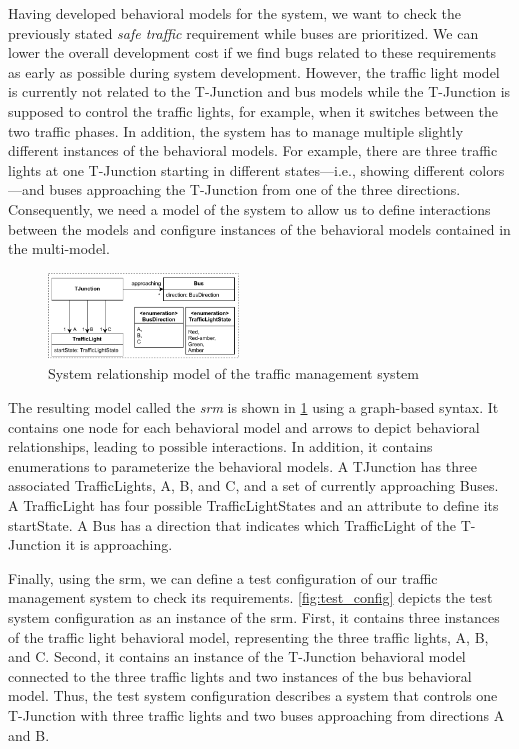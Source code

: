 \documentclass{jot}
\begin{document}
Having developed behavioral models for the system, we want to check the previously stated \textit{safe traffic} requirement while buses are prioritized.
We can lower the overall development cost if we find bugs related to these requirements as early as possible during system development.
However, the traffic light model is currently not related to the T-Junction and bus models while the T-Junction is supposed to control the traffic lights, for example, when it switches between the two traffic phases.
In addition, the system has to manage multiple slightly different instances of the behavioral models.
For example, there are three traffic lights at one T-Junction starting in different states---i.e., showing different colors---and buses approaching the T-Junction from one of the three directions.
Consequently, we need a model of the system to allow us to define interactions between the models and configure instances of the behavioral models contained in the multi-model.

\begin{figure}[h]
    \centering
    \includegraphics[width=0.45\textwidth]{figures/systemRelationShipModel.pdf}
    \caption{System relationship model of the traffic management system}
    \label{fig:systemRelationshipModel}
\end{figure}

The resulting model called the \textit{\gls*{srm}} is shown in \cref{fig:systemRelationshipModel} using a graph-based syntax.
It contains one node for each behavioral model and arrows to depict behavioral relationships, leading to possible interactions.
In addition, it contains enumerations to parameterize the behavioral models. 
A \textsf{TJunction} has three associated \textsf{TrafficLight}s, \textsf{A}, \textsf{B}, and \textsf{C}, and a set of currently approaching \textsf{Bus}es.
A \textsf{TrafficLight} has four possible \textsf{TrafficLightState}s and an attribute to define its \textsf{startState}.
A \textsf{Bus} has a \textsf{direction} that indicates which \textsf{TrafficLight} of the T-Junction it is approaching.

Finally, using the \gls*{srm}, we can define a test configuration of our traffic management system to check its requirements.
\autoref{fig:test_config} depicts the test system configuration as an instance of the \gls*{srm}.
First, it contains three instances of the traffic light behavioral model, representing the three traffic lights, \textsf{A}, \textsf{B}, and \textsf{C}.
Second, it contains an instance of the T-Junction behavioral model connected to the three traffic lights and two instances of the bus behavioral model.
Thus, the test system configuration describes a system that controls one T-Junction with three traffic lights and two buses approaching from directions A and B.
\end{document}
